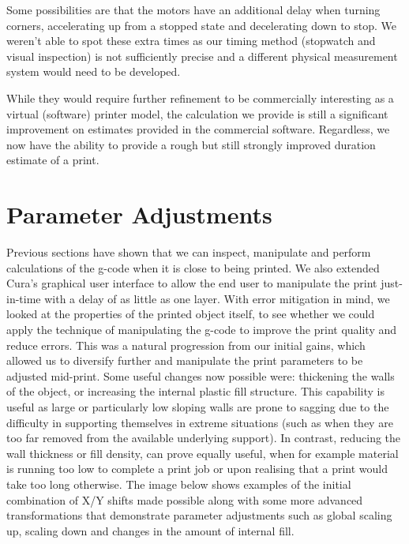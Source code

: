 \documentclass[11pt]{report} %
\begin{document}
Some possibilities are that the motors have an additional delay when turning corners, accelerating up from a stopped state and decelerating down to stop. We weren't able to spot these extra times as our timing method (stopwatch and visual inspection) is not sufficiently precise and a different physical measurement system would need to be developed.

While they would require further refinement to be commercially interesting as a virtual (software) printer model, the calculation we provide is still a significant improvement on estimates provided in the commercial software. Regardless, we now have the ability to provide a rough but still strongly improved duration estimate of a print.





\section{Parameter Adjustments}
\label{section:ParameterAdjustments}
Previous sections have shown that we can inspect, manipulate and perform calculations of the g-code when it is close to being printed. We also extended Cura's graphical user interface to allow the end user to manipulate the print just-in-time with a delay of as little as one layer.
	With error mitigation in mind, we looked at the properties of the printed object itself, to see whether we could apply the technique of manipulating the g-code to improve the print quality and reduce errors. This was a natural progression from our initial gains, which allowed us to diversify further and manipulate the print parameters to be adjusted mid-print.
Some useful changes now possible were: thickening the walls of the object, or increasing the internal plastic fill structure. This capability is useful as large or particularly low sloping walls are prone to sagging due to the difficulty in supporting themselves in extreme situations (such as when they are too far removed from the available underlying support). In contrast, reducing the wall thickness or fill density, can prove equally useful, when for example material is running too low to complete a print job or upon realising that a print would take too long otherwise.
The image below shows examples of the initial combination of X/Y shifts made possible along with some more advanced transformations that demonstrate parameter adjustments such as global scaling up, scaling down and changes in the amount of internal fill.
\end{document}
